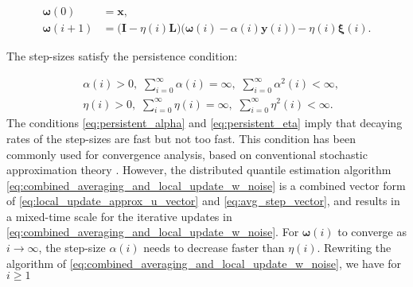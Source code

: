\documentclass[journal]{IEEEtran}
\begin{document}
\vspace{-4mm}
\small
\begin{align}
\bm{\omega}(0) &= \mathbf{x},\nonumber \\
\bm{\omega}(i+1) &= \big(\mathbf{I} - \eta(i)\mathbf{L}\big)\big(\bm{\omega}(i)- \alpha(i)\mathbf{y}(i)\big) - \eta(i) \bm{\xi}(i).\label{eq:combined_averaging_and_local_update_w_noise}
\end{align}
\normalsize

The step-sizes satisfy the persistence condition:

\vspace{-4mm}
\small 
\begin{align}
&\alpha(i) > 0, \,\,\sum_{i=0}^{\infty}\alpha(i) = \infty,\,\, \sum_{i=0}^{\infty} \alpha^2(i) < \infty, \label{eq:persistent_alpha}\\
&\eta(i) > 0, \,\,\sum_{i=0}^{\infty}\eta(i) = \infty,\,\, \sum_{i=0}^{\infty} \eta^2(i) < \infty. \label{eq:persistent_eta}
\end{align}
\normalsize
The conditions \eqref{eq:persistent_alpha} and \eqref{eq:persistent_eta} imply that decaying rates of the step-sizes are fast but not too fast. This condition has been commonly used for convergence analysis, based on conventional stochastic approximation theory \cite{Nevelson1973,Spall2003,Chen2006}. However, the distributed quantile estimation algorithm \eqref{eq:combined_averaging_and_local_update_w_noise} is a combined vector form of \eqref{eq:local_update_approx_u_vector} and \eqref{eq:avg_step_vector}, and results in a mixed-time scale for the iterative updates in \eqref{eq:combined_averaging_and_local_update_w_noise}. {}{For $\bm{\omega}(i)$ to converge as $i \to \infty$, the step-size $\alpha(i)$ needs to decrease faster than $\eta(i)$. Rewriting the algorithm of \eqref{eq:combined_averaging_and_local_update_w_noise}, we have for $i \ge 1$}
\end{document}
